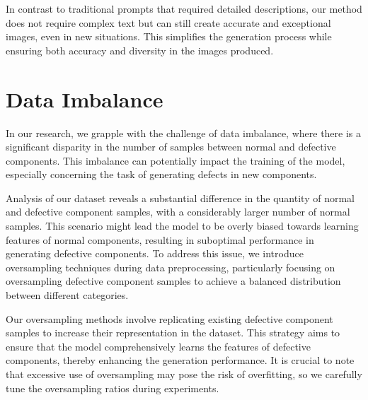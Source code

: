 In contrast to traditional prompts that required detailed descriptions, our method does not require complex text but can still create accurate and exceptional images, even in new situations. This simplifies the generation process while ensuring both accuracy and diversity in the images produced.


\section{Data Imbalance}

In our research, we grapple with the challenge of data imbalance, where there is a significant disparity in the number of samples between normal and defective components. This imbalance can potentially impact the training of the model, especially concerning the task of generating defects in new components.

Analysis of our dataset reveals a substantial difference in the quantity of normal and defective component samples, with a considerably larger number of normal samples. This scenario might lead the model to be overly biased towards learning features of normal components, resulting in suboptimal performance in generating defective components. To address this issue, we introduce oversampling techniques during data preprocessing, particularly focusing on oversampling defective component samples to achieve a balanced distribution between different categories.

Our oversampling methods involve replicating existing defective component samples to increase their representation in the dataset. This strategy aims to ensure that the model comprehensively learns the features of defective components, thereby enhancing the generation performance. It is crucial to note that excessive use of oversampling may pose the risk of overfitting, so we carefully tune the oversampling ratios during experiments.
